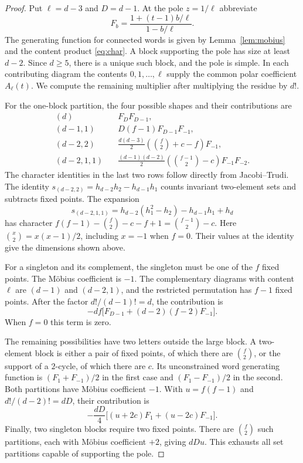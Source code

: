 \begin{proof}
Put $\ell=d-3$ and $D=d-1$. At the pole $z=1/\ell$ abbreviate
\[
 F_b=\frac{1+(t-1)b/\ell}{1-b/\ell}.
\]
The generating function for connected words is given by
Lemma~\ref{lem:mobius} and the content product \eqref{eq:char}. A block supporting the pole has size at least $d-2$.
Since $d\ge5$, there is a unique such block, and the pole is simple.
In each contributing diagram the contents $0,1,\ldots,\ell$ supply
the common polar coefficient $A_\ell(t)$. We compute the remaining
multiplier after multiplying the residue by $d!$.

For the one-block partition, the four possible shapes and their
contributions are
\begin{align*}
 (d)       &\quad F_DF_{D-1},\\
 (d-1,1)   &\quad D(f-1)F_{D-1}F_{-1},\\
 (d-2,2)   &\quad \frac{d(d-3)}{2}
                   \left(\binom f2+c-f\right)F_{-1},\\
 (d-2,1,1) &\quad \frac{(d-1)(d-2)}{2}
                   \left(\binom{f-1}{2}-c\right)F_{-1}F_{-2}.
\end{align*}
The character identities in the last two rows follow directly
from Jacobi--Trudi. The identity
$s_{(d-2,2)}=h_{d-2}h_2-h_{d-1}h_1$
counts invariant two-element sets and subtracts fixed points.
The expansion
\[
 s_{(d-2,1,1)}
 =h_{d-2}(h_1^2-h_2)-h_{d-1}h_1+h_d
\]
has character $f(f-1)-\binom f2-c-f+1
=\binom{f-1}{2}-c$.
Here $\binom x2=x(x-1)/2$, including $x=-1$ when $f=0$.
Their values at the identity give the dimensions shown above.

For a singleton and its complement, the singleton must be one of
the $f$ fixed points. The Möbius coefficient is $-1$. The
complementary diagrams with content $\ell$ are $(d-1)$ and
$(d-2,1)$, and the restricted permutation has $f-1$ fixed points.
After the factor $d!/(d-1)!=d$, the contribution is
\[
 -df\bigl[F_{D-1}+(d-2)(f-2)F_{-1}\bigr].
\]
When $f=0$ this term is zero.

The remaining possibilities have two letters outside the large
block. A two-element block is either a pair of fixed points, of
which there are $\binom f2$, or the support of a $2$-cycle, of
which there are $c$. Its unconstrained word generating function
is $(F_1+F_{-1})/2$ in the first case and
$(F_1-F_{-1})/2$ in the second. Both partitions have Möbius
coefficient $-1$. With $u=f(f-1)$ and
$d!/(d-2)!=dD$, their contribution is
\[
 -\frac{dD}{4}\bigl[(u+2c)F_1+(u-2c)F_{-1}\bigr].
\]
Finally, two singleton blocks require two fixed points.
There are $\binom f2$ such partitions, each with Möbius coefficient
$+2$, giving $dD u$. This exhausts all set partitions capable
of supporting the pole.


\end{proof}
